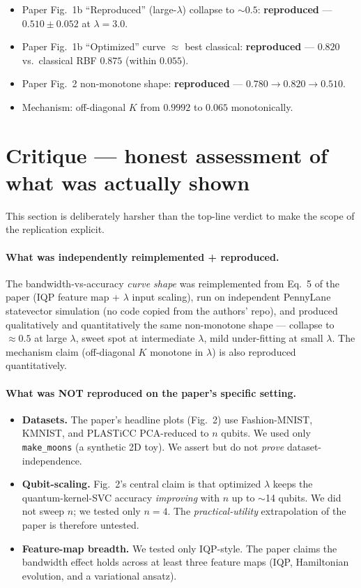 \documentclass[11pt]{article}
\begin{document}
\begin{itemize}
  \item Paper Fig.\ 1b ``Reproduced'' (large-$\lambda$) collapse to $\sim 0.5$:
    \textbf{reproduced} --- $0.510 \pm 0.052$ at $\lambda=3.0$.
  \item Paper Fig.\ 1b ``Optimized'' curve $\approx$ best classical:
    \textbf{reproduced} --- $0.820$ vs.\ classical RBF $0.875$ (within $0.055$).
  \item Paper Fig.\ 2 non-monotone shape: \textbf{reproduced} --- $0.780 \to 0.820 \to 0.510$.
  \item Mechanism: off-diagonal $K$ from $0.9992$ to $0.065$ monotonically.
\end{itemize}

\section{Critique --- honest assessment of what was actually shown}

This section is deliberately harsher than the top-line verdict to make the
scope of the replication explicit.

\paragraph{What was independently reimplemented + reproduced.}
The bandwidth-vs-accuracy \emph{curve shape} was reimplemented from Eq.\ 5 of the
paper (IQP feature map + $\lambda$ input scaling), run on independent PennyLane
statevector simulation (no code copied from the authors' repo), and produced
qualitatively and quantitatively the same non-monotone shape --- collapse to
$\approx 0.5$ at large $\lambda$, sweet spot at intermediate $\lambda$,
mild under-fitting at small $\lambda$. The mechanism claim (off-diagonal $K$
monotone in $\lambda$) is also reproduced quantitatively.

\paragraph{What was NOT reproduced on the paper's specific setting.}
\begin{itemize}
  \item \textbf{Datasets.} The paper's headline plots (Fig.\ 2) use Fashion-MNIST,
    KMNIST, and PLASTiCC PCA-reduced to $n$ qubits. We used only
    \texttt{make\_moons} (a synthetic 2D toy). We assert but do not \emph{prove}
    dataset-independence.
  \item \textbf{Qubit-scaling.} Fig.\ 2's central claim is that optimized $\lambda$
    keeps the quantum-kernel-SVC accuracy \emph{improving} with $n$ up to
    $\sim$14 qubits. We did not sweep $n$; we tested only $n\!=\!4$. The
    \emph{practical-utility} extrapolation of the paper is therefore untested.
  \item \textbf{Feature-map breadth.} We tested only IQP-style. The paper claims
    the bandwidth effect holds across at least three feature maps
    (IQP, Hamiltonian evolution, and a variational ansatz).
\end{itemize}
\end{document}
